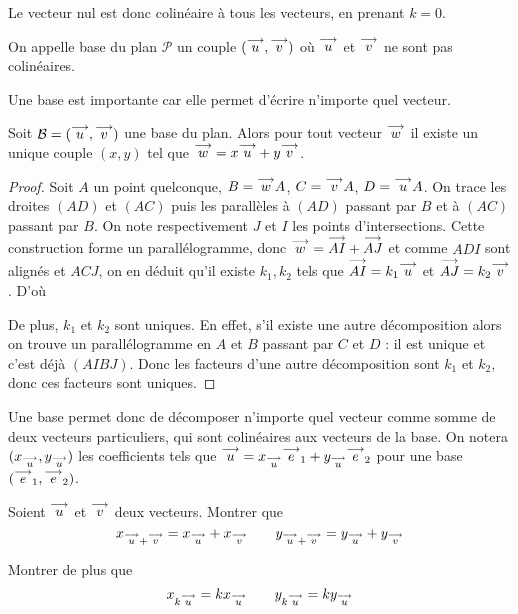 \begin{rmk}
    Le vecteur nul est donc colinéaire à tous les vecteurs, en prenant $k=0$.
\end{rmk}

\begin{defi}
    On appelle base du plan $\mathcal P$ un couple $(\overset{\longrightarrow}{u}, \overset{\longrightarrow}{v})$ où $\overset{\longrightarrow}{u}$ et $\overset{\longrightarrow}{v}$ ne sont pas colinéaires.
\end{defi}

Une base est importante car elle permet d'écrire n'importe quel vecteur.

\begin{prop}
    Soit $\mathcal B=(\overset{\longrightarrow}{u},\overset{\longrightarrow}{v})$ une base du plan. Alors pour tout vecteur $\overset{\longrightarrow}{w}$ il existe un unique couple $(x,y)$ tel que $\overset{\longrightarrow}{w} = x\overset{\longrightarrow}{u} + y\overset{\longrightarrow}{v}$.
\end{prop}
\begin{proof}
    Soit $A$ un point quelconque, $B=\overset{\longrightarrow}{w} A$, $C=\overset{\longrightarrow}{v} A$, $D=\overset{\longrightarrow}{u} A$. On trace les droites $(AD)$ et $(AC)$ puis les parallèles à $(AD)$ passant par $B$ et à $(AC)$ passant par $B$. On note respectivement $J$ et $I$ les points d'intersections. Cette construction forme un parallélogramme, donc $\overset{\longrightarrow}{w}=\overset{\longrightarrow}{AI}+\overset{\longrightarrow}{AJ}$ et comme $ADI$ sont alignés et $ACJ$, on en déduit qu'il existe $k_1,k_2$ tels que $\overset{\longrightarrow}{AI}=k_1\overset{\longrightarrow}{u}$ et $\overset{\longrightarrow}{AJ}=k_2\overset{\longrightarrow}{v}$. D'où 
    
    De plus, $k_1$ et $k_2$ sont uniques. En effet, s'il existe une autre décomposition alors on trouve un parallélogramme en $A$ et $B$ passant par $C$ et $D$ : il est unique et c'est déjà $(AIBJ)$. Donc les facteurs d'une autre décomposition sont $k_1$ et $k_2$, donc ces facteurs sont uniques.
\end{proof}


Une base permet donc de décomposer n'importe quel vecteur comme somme de deux vecteurs particuliers, qui sont colinéaires aux vecteurs de la base. On notera $(x_{\overset{\longrightarrow}{u}},y_{\overset{\longrightarrow}{u}})$ les coefficients tels que $\overset{\longrightarrow}{u} = x_{\overset{\longrightarrow}{u}} \overset{\longrightarrow}{e}_1 + y_{\overset{\longrightarrow}{u}} \overset{\longrightarrow}{e}_2$ pour une base $(\overset{\longrightarrow}{e}_1,\overset{\longrightarrow}{e}_2)$.

\begin{exo}
    Soient $\overset{\longrightarrow}{u}$ et $\overset{\longrightarrow}{v}$ deux vecteurs. Montrer que $$ x_{\overset{\longrightarrow}{u}+\overset{\longrightarrow}{v}}=x_{\overset{\longrightarrow}{u}}+x_{\overset{\longrightarrow}{v}}\qquad y_{\overset{\longrightarrow}{u}+\overset{\longrightarrow}{v}}=y_{\overset{\longrightarrow}{u}}+y_{\overset{\longrightarrow}{v}}$$
    
    Montrer de plus que $$x_{k\overset{\longrightarrow}{u}}=kx_{\overset{\longrightarrow}{u}}\qquad y_{k\overset{\longrightarrow}{u}}=ky_{\overset{\longrightarrow}{u}}$$
\end{exo}

